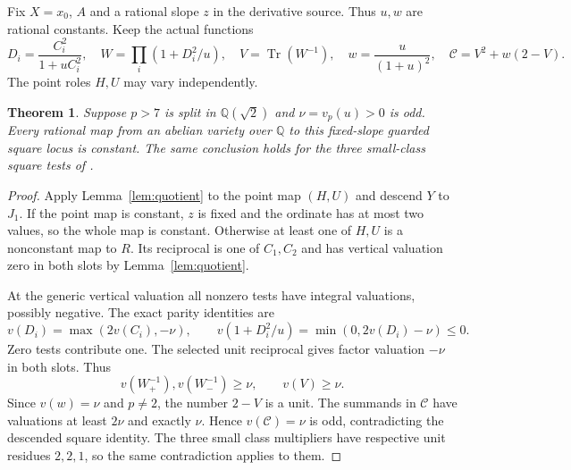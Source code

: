 \documentclass[11pt,a4paper]{article}
\newtheorem{theorem}{Theorem}[section]
\newcommand{\Q}{\mathbb Q}
\DeclareMathOperator{\Tr}{Tr}
\begin{document}
Fix $X=x_0$, $A$ and a rational slope $z$ in the derivative
source. Thus $u,w$ are rational constants. Keep the actual functions
\[
 D_i=\frac{C_i^2}{1+uC_i^2},\quad
 W=\prod_i(1+D_i^2/u),\quad
 V=\Tr(W^{-1}),\quad w=\frac{u}{(1+u)^2},\quad
 \mathcal C=V^2+w(2-V).
\]
The point roles $H,U$ may vary independently.

\begin{theorem}\label{thm:derivative}
Suppose $p>7$ is split in $\Q(\sqrt2)$ and
$\nu=v_p(u)>0$ is odd. Every rational map from an abelian
variety over $\Q$ to this fixed-slope guarded square locus is
constant. The same conclusion holds for the three small-class
square tests of \cite{Families}.
\end{theorem}
\begin{proof}
Apply Lemma~\ref{lem:quotient} to the point map $(H,U)$ and
descend $Y$ to $J_1$. If the point map is constant, $z$ is fixed
and the ordinate has at most two values, so the whole map is constant.
Otherwise at least one of $H,U$ is a nonconstant map to $R$.
Its reciprocal is one of $C_1,C_2$ and has vertical valuation zero
in both slots by Lemma~\ref{lem:quotient}.

At the generic vertical valuation all nonzero tests have integral
valuations, possibly negative. The exact parity identities are
\[
 v(D_i)=\max(2v(C_i),-\nu),\qquad
 v(1+D_i^2/u)=\min(0,2v(D_i)-\nu)\le0.
\]
Zero tests contribute one. The selected unit reciprocal gives
factor valuation $-\nu$ in both slots. Thus
\[
 v(W_+^{-1}),v(W_-^{-1})\ge\nu,\qquad v(V)\ge\nu.
\]
Since $v(w)=\nu$ and $p\ne2$, the number $2-V$ is a unit.
The summands in $\mathcal C$ have valuations at least $2\nu$
and exactly $\nu$. Hence $v(\mathcal C)=\nu$ is odd,
contradicting the descended square identity. The three small
class multipliers have respective unit residues $2,2,1$, so
the same contradiction applies to them.
\end{proof}
\end{document}

